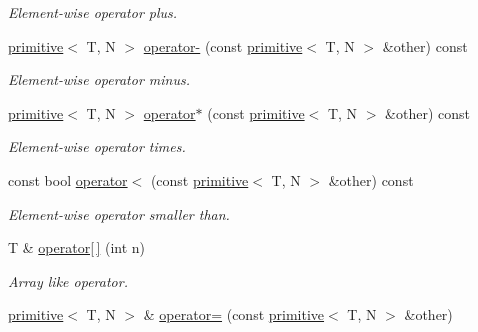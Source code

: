 \begin{DoxyCompactItemize}
\begin{DoxyCompactList}\small\item\em Element-\/wise operator plus. \end{DoxyCompactList}\item 
\hypertarget{classprimitive_a15085b3c24fe3d823ab359d63b39fca8}{}\hyperlink{classprimitive}{primitive}$<$ T, N $>$ \hyperlink{classprimitive_a15085b3c24fe3d823ab359d63b39fca8}{operator-\/} (const \hyperlink{classprimitive}{primitive}$<$ T, N $>$ \&other) const \label{classprimitive_a15085b3c24fe3d823ab359d63b39fca8}

\begin{DoxyCompactList}\small\item\em Element-\/wise operator minus. \end{DoxyCompactList}\item 
\hypertarget{classprimitive_a531bb4680ec7342189ff175fcebdc742}{}\hyperlink{classprimitive}{primitive}$<$ T, N $>$ \hyperlink{classprimitive_a531bb4680ec7342189ff175fcebdc742}{operator$\ast$} (const \hyperlink{classprimitive}{primitive}$<$ T, N $>$ \&other) const \label{classprimitive_a531bb4680ec7342189ff175fcebdc742}

\begin{DoxyCompactList}\small\item\em Element-\/wise operator times. \end{DoxyCompactList}\item 
const bool \hyperlink{classprimitive_a8a3fceb6591fc649e2808a433468d79b}{operator$<$} (const \hyperlink{classprimitive}{primitive}$<$ T, N $>$ \&other) const 
\begin{DoxyCompactList}\small\item\em Element-\/wise operator smaller than. \end{DoxyCompactList}\item 
\hypertarget{classprimitive_a69f2af38b5df19e6f85020d66580c431}{}T \& \hyperlink{classprimitive_a69f2af38b5df19e6f85020d66580c431}{operator\mbox{[}$\,$\mbox{]}} (int n)\label{classprimitive_a69f2af38b5df19e6f85020d66580c431}

\begin{DoxyCompactList}\small\item\em Array like operator. \end{DoxyCompactList}\item 
\hypertarget{classprimitive_ae3d7c8936d130162506c4141849d41e0}{}\hyperlink{classprimitive}{primitive}$<$ T, N $>$ \& \hyperlink{classprimitive_ae3d7c8936d130162506c4141849d41e0}{operator=} (const \hyperlink{classprimitive}{primitive}$<$ T, N $>$ \&other)\label{classprimitive_ae3d7c8936d130162506c4141849d41e0}


\end{DoxyCompactItemize}

